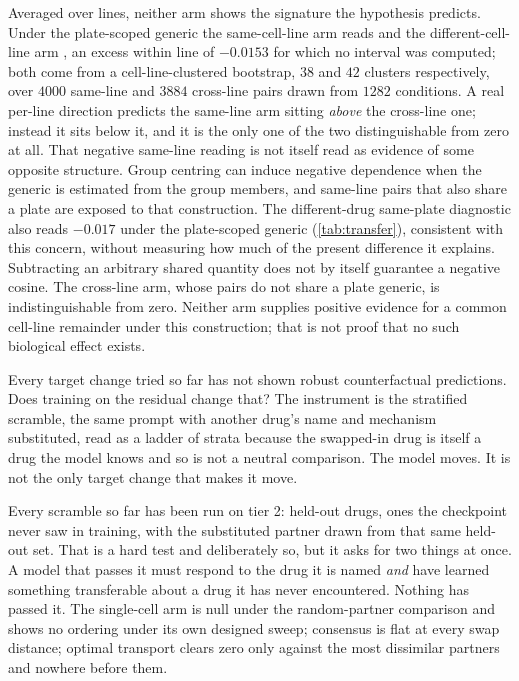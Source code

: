 Averaged over lines, neither arm shows the signature the hypothesis predicts.
Under the plate-scoped generic the same-cell-line arm reads
 and the different-cell-line arm
, an excess within line of $-0.0153$ for which no
interval was computed; both come from a cell-line-clustered bootstrap,
$\num{38}$ and $\num{42}$ clusters respectively, over $\num{4000}$ same-line and
$\num{3884}$ cross-line pairs drawn from $\num{1282}$ conditions. A real
per-line direction predicts the same-line arm sitting \emph{above} the
cross-line one; instead it sits below it, and it is the only one of the two
distinguishable from zero at all. That negative same-line reading is not itself
read as evidence of some opposite structure. Group centring can induce negative
dependence when the generic is estimated from the group members, and same-line
pairs that also share a plate are exposed to that construction. The
different-drug same-plate diagnostic also reads $-0.017$ under the plate-scoped
generic (\cref{tab:transfer}), consistent with this concern, without measuring
how much of the present difference it explains. Subtracting an arbitrary shared
quantity does not by itself guarantee a negative cosine. The cross-line arm,
whose pairs do not share a plate generic, is indistinguishable from zero.
Neither arm supplies positive evidence for a common cell-line remainder under
this construction; that is not proof that no such biological effect exists.



\begin{question}[5]
Every target change tried so far has not shown robust counterfactual predictions. Does training on the residual change that? The instrument is the
stratified scramble, the same prompt with another drug's name and mechanism
substituted, read as a ladder of strata because the swapped-in drug is itself a
drug the model knows and so is not a neutral comparison. The model moves. It is
not the only target change that makes it move.
\end{question}

\noindent

Every scramble so far has been run on tier 2: held-out drugs, ones the
checkpoint never saw in training, with the substituted partner drawn from that
same held-out set. That is a hard test and deliberately so, but it asks for two
things at once. A model that passes it must respond to the drug it is named
\emph{and} have learned something transferable about a drug it has never
encountered. Nothing has passed it. The single-cell arm is null under the
random-partner comparison and shows no ordering under its own designed sweep;
consensus is flat at every swap distance; optimal transport clears zero only
against the most dissimilar partners and nowhere before them.

